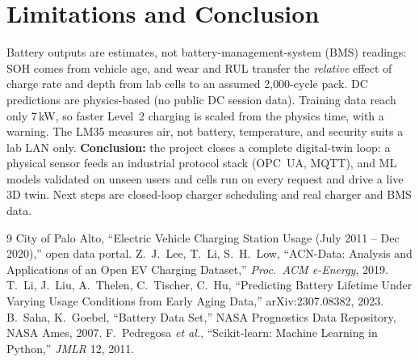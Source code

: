 \documentclass[11pt,a4paper]{article}
\begin{document}
\section{Limitations and Conclusion}
Battery outputs are estimates, not battery-management-system (BMS) readings: SOH comes from vehicle age, and wear and
RUL transfer the \emph{relative} effect of charge rate and depth from lab cells to an assumed 2{,}000-cycle pack. DC
predictions are physics-based (no public DC session data). Training data reach only 7\,kW, so faster Level~2 charging
is scaled from the physics time, with a warning. The LM35 measures air, not battery, temperature, and security suits
a lab LAN only. \textbf{Conclusion:} the project closes a complete digital-twin loop: a physical sensor feeds an
industrial protocol stack (OPC~UA, MQTT), and ML models validated on unseen users and cells run on every request and
drive a live 3D twin. Next steps are closed-loop charger scheduling and real charger and BMS data.

{\footnotesize
\begin{thebibliography}{9}\setlength{\itemsep}{0pt}
   City of Palo Alto, ``Electric Vehicle Charging Station Usage (July 2011 -- Dec 2020),'' open data portal.
   Z.\ J.\ Lee, T.\ Li, S.\ H.\ Low, ``ACN-Data: Analysis and Applications of an Open EV Charging
        Dataset,'' \emph{Proc.\ ACM e-Energy}, 2019.
   T.\ Li, J.\ Liu, A.\ Thelen, C.\ Tischer, C.\ Hu, ``Predicting Battery Lifetime Under Varying Usage
        Conditions from Early Aging Data,'' arXiv:2307.08382, 2023.
   B.\ Saha, K.\ Goebel, ``Battery Data Set,'' NASA Prognostics Data Repository, NASA Ames, 2007.
   F.\ Pedregosa \emph{et al.}, ``Scikit-learn: Machine Learning in Python,'' \emph{JMLR} 12, 2011.
\end{thebibliography}
}
\end{document}

